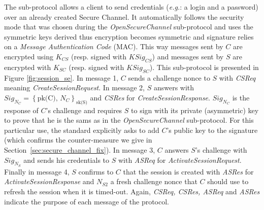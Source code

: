 \newcommand{\csreq}{CSReq}
\newcommand{\csres}{CSRes}
\newcommand{\asreq}{ASReq}
\newcommand{\asres}{ASRes}

The  sub-protocol allows a client to send
credentials (\emph{e.g.}: a login and a password) over an already
created Secure Channel.  It automatically follows the security mode
that was chosen during the {\em OpenSecureChannel} sub-protocol and
uses the symmetric keys derived thus encryption becomes symmetric and
signature relies on a \emph{Message Authentication Code} (MAC).  This
way messages sent by $C$ are encrypted using $K_{CS}$ (resp. signed with
$KSig_{CS}$) and messages sent by $S$ are encrypted with $K_{SC}$
(resp. signed with $KSig_{SC}$).  This sub-protocol is presented in
Figure \ref{fig:session_se}.  In message 1, $C$ sends a challenge
nonce to $S$ with {\em CSReq} meaning {\em CreateSessionRequest}.  In
message 2, $S$ answers with $Sig_{N_{C}} = \left\{\mbox{pk(C),
  $N_{C}$}\right\}_{\mbox{sk(S)}}$ and {\em CSRes} for {\em
  CreateSessionResponse}.  $Sig_{N_{C}}$ is the response of $C$'s 
challenge and requires $S$ to sign with its private (asymmetric) key to
prove that he is the sams as in the {\em OpenSecureChannel}
sub-protocol.  For this particular use, the \opcua standard explicitly
asks to add $C$'s  public key to the signature (which confirms the
counter-measure we give in Section~\ref{sec:secure_channel_fix}).  In
message 3, $C$ answers $S$'s  challenge with $Sig_{N_{S}}$ and sends his
credentials to $S$ with {\em ASReq} for {\em ActivateSessionRequest}.
Finally in message 4, $S$ confirms to $C$ that the session is created
with {\em ASRes} for {\em ActivateSessionResponse} and $N_{S2}$ a
fresh challenge nonce that $C$ should use to refresh the session when it
is timed-out.  Again, {\em CSReq, CSRes, ASReq} and {\em ASRes}
indicate the purpose of each message of the protocol.

